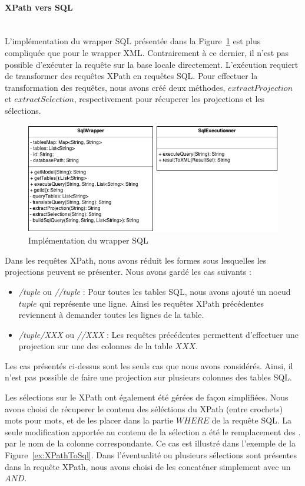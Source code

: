 \documentclass[a4paper,10pt]{article}
\newcommand{\fref}[1]{Figure~\ref{#1}}
\begin{document}
\paragraph{XPath vers SQL}~~\\

L'implémentation du wrapper SQL présentée dans la \fref{fig:wrapperSQL} est plus compliquée que pour le wrapper XML. Contrairement à ce dernier, il n'est pas possible d'exécuter la requête sur la base locale directement. L'exécution requiert de transformer des requêtes XPath en requêtes SQL. Pour effectuer la transformation des requêtes, nous avons créé deux méthodes, \(extractProjection\) et \(extractSelection\), respectivement pour récuperer les projections et les sélections.

\begin{figure}[ht!]
    \centering
    \includegraphics{WrapperSQL.png}
    \caption{Implémentation du wrapper SQL}
    \label{fig:wrapperSQL}
\end{figure}

Dans les requêtes XPath, nous avons réduit les formes sous lesquelles les projections peuvent se présenter. Nous avons gardé les cas suivants :
\begin{itemize}
\item \emph{/tuple} ou \emph{//tuple} : Pour toutes les tables SQL, nous avons ajouté un noeud \(tuple\) qui représente une ligne. Ainsi les requêtes XPath précédentes reviennent à demander toutes les lignes de la table.
\item \emph{/tuple/XXX} ou \emph{//XXX} : Les requêtes précédentes permettent d'effectuer une projection sur une des colonnes de la table \(XXX\).
\end{itemize}

Les cas présentés ci-dessus sont les seuls cas que nous avons considérés. Ainsi, il n'est pas possible de faire une projection sur plusieurs colonnes des tables SQL.


Les sélections sur le XPath ont également été gérées de façon simplifiées. Nous avons choisi de récuperer le contenu des séléctions du XPath (entre crochets) mots pour mots, et de les placer dans la partie \(WHERE\) de la requête SQL. La seule modification apportée au contenu de la sélection a été le remplacement des \(.\) par le nom de la colonne correspondante. Ce cas est illustré dans l'exemple de la \fref{ex:XPathToSql}. Dans l'éventualité ou plusieurs sélections sont présentes dans la requête XPath, nous avons choisi de les concaténer simplement avec un \(AND\).
\end{document}
